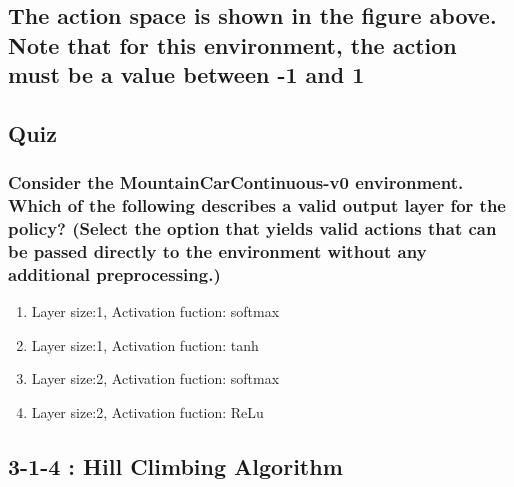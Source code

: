 \documentclass[11pt]{article}
\providecommand{\tightlist}{%
      \setlength{\itemsep}{0pt}\setlength{\parskip}{0pt}}
\begin{document}
\hypertarget{the-action-space-is-shown-in-the-figure-above.-note-that-for-this-environment-the-action-must-be-a-value-between--1-and-1}{%
\subsection{The action space is shown in the figure above. Note that for
this environment, the action must be a value between -1 and
1}\label{the-action-space-is-shown-in-the-figure-above.-note-that-for-this-environment-the-action-must-be-a-value-between--1-and-1}}

    \hypertarget{quiz}{%
\subsection{Quiz}\label{quiz}}

\hypertarget{consider-the-mountaincarcontinuous-v0-environment.-which-of-the-following-describes-a-valid-output-layer-for-the-policy-select-the-option-that-yields-valid-actions-that-can-be-passed-directly-to-the-environment-without-any-additional-preprocessing.}{%
\subsubsection{Consider the MountainCarContinuous-v0 environment. Which
of the following describes a valid output layer for the policy? (Select
the option that yields valid actions that can be passed directly to the
environment without any additional
preprocessing.)}\label{consider-the-mountaincarcontinuous-v0-environment.-which-of-the-following-describes-a-valid-output-layer-for-the-policy-select-the-option-that-yields-valid-actions-that-can-be-passed-directly-to-the-environment-without-any-additional-preprocessing.}}

\begin{enumerate}
\def\labelenumi{\arabic{enumi}.}
\tightlist
\item
  Layer size:1, Activation fuction: softmax
\item
  Layer size:1, Activation fuction: tanh
\item
  Layer size:2, Activation fuction: softmax
\item
  Layer size:2, Activation fuction: ReLu
\end{enumerate}

    \hypertarget{hill-climbing-algorithm}{%
\subsection{3-1-4 : Hill Climbing
Algorithm}\label{hill-climbing-algorithm}}
\end{document}
